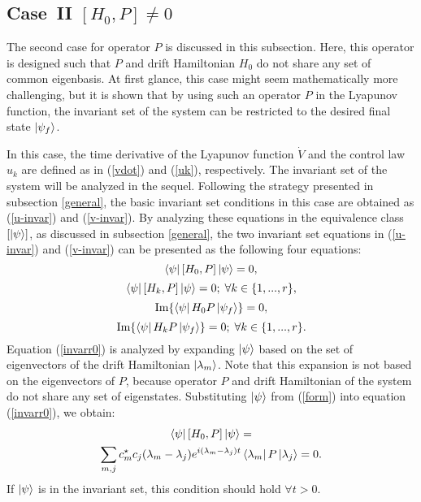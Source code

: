 \documentclass[journal]{IEEEtran}
\theoremstyle{definition}
\begin{document}
\subsection{Case~II $[H_0,P]\neq0$}\label{case2}

The second case for operator $P$ is discussed in this subsection. Here, this operator is designed such that $P$ and drift Hamiltonian $H_0$ do not share any set of common eigenbasis. At first glance, this case might seem mathematically more challenging, but it is shown that by using such an operator $P$ in the Lyapunov function, the invariant set of the system can be restricted to the desired final state $\ket{\psi_f}$.

In this case, the time derivative of the Lyapunov function $\dot{V}$ and the control law $u_k$ are defined as in (\ref{vdot}) and (\ref{uk}), respectively. The invariant set of the system will be analyzed in the sequel. Following the strategy presented in subsection \ref{general}, the basic invariant set conditions in this case are obtained as (\ref{u-invar}) and (\ref{v-invar}). By analyzing these equations in the equivalence class $[\ket{\psi}]$, as discussed in subsection \ref{general}, the two invariant set equations in (\ref{u-invar}) and (\ref{v-invar}) can be presented as the following four equations:
 \begin{equation}\label{invarr0}
      \bra{\psi}[H_0,P]\ket{\psi}=0,
 \end{equation}
 \begin{equation}\label{invarr1}
    \bra{\psi}[H_k,P]\ket{\psi}=0; \; \forall{k}\in \{1,...,r\},
 \end{equation}
 \begin{equation}\label{invarr2}
      \text{Im}\{\bra{\psi}H_0 P\ket{\psi_f}\}=0,
 \end{equation}
 \begin{equation}\label{invarr3}
     \text{Im}\{\bra{\psi}H_k P\ket{\psi_f}\}=0; \; \forall{k}\in \{1,...,r\}.
 \end{equation}
Equation (\ref{invarr0}) is analyzed by expanding $\ket{\psi}$ based on the set of eigenvectors of the drift Hamiltonian $\ket{\lambda_m}$. Note that this expansion is not based on the eigenvectors of $P$, because operator $P$ and drift Hamiltonian of the system do not share any set of eigenstates.
Substituting $\ket{\psi}$ from (\ref{form}) into equation (\ref{invarr0}), we obtain:
\begin{multline}\label{eq}
     \bra{\psi}[H_0,P]\ket{\psi}= \\ \displaystyle\sum_{m,j}c_m^{\star}c_j(\lambda_m-\lambda_j)e^{i(\lambda_m-\lambda_j)t}\bra{\lambda_m}P\ket{\lambda_j}=0.
\end{multline}
If $\ket{\psi}$ is in the invariant set, this condition should hold $\forall t>0$.
\end{document}
